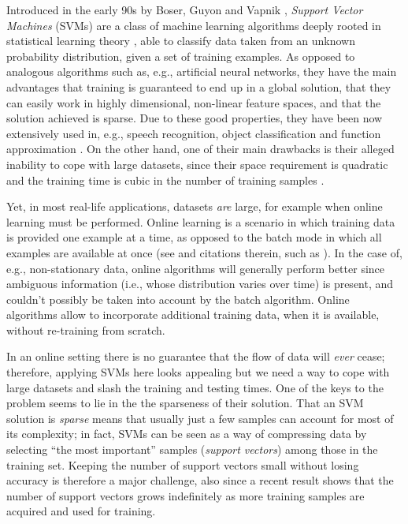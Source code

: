 Introduced in the early 90s by Boser, Guyon and Vapnik \cite{BGV92},
\emph{Support Vector Machines} (SVMs) are a class of machine learning
algorithms deeply rooted in statistical learning theory
\cite{v-edbed-82}, able to classify data taken from an unknown
probability distribution, given a set of training examples. As opposed
to analogous algorithms such as, e.g., artificial neural networks,
they have the main advantages that training is guaranteed to end up in
a global solution, that they can easily work in highly dimensional,
non-linear feature spaces, and that the solution achieved is
sparse. Due to these good properties, they have been now extensively
used in, e.g., speech recognition, object classification and function
approximation \cite{Cristianini00}. On the other hand, one of their
main drawbacks is their alleged inability to cope with large datasets,
since their space requirement is quadratic and the training time is
cubic in the number of training samples \cite{KeerthiCDC06}.

Yet, in most real-life applications, datasets \emph{are} large, for
example when online learning must be performed. Online learning is a
scenario in which training data is provided one example at a time, as
opposed to the batch mode in which all examples are available at once
(see \cite{Laskov2006} and citations therein, such as
\cite{Munro1951,lecun98efficient,Murata2002}). In the case of, e.g.,
non-stationary data, online algorithms will generally perform better
since ambiguous information (i.e., whose distribution varies over
time) is present, and couldn't possibly be taken into account by the
batch algorithm. Online algorithms allow to incorporate additional
training data, when it is available, without re-training from scratch.

In an online setting there is no guarantee that the flow of data will
\emph{ever} cease; therefore, applying SVMs here looks appealing but
we need a way to cope with large datasets and slash the training and
testing times. One of the keys to the problem seems to lie in the the
sparseness of their solution. That an SVM solution is \emph{sparse}
means that usually just a few samples can account for most of its
complexity; in fact, SVMs can be seen as a way of compressing data by
selecting ``the most important'' samples (\emph{support vectors})
among those in the training set. Keeping the number of support vectors
small without losing accuracy is therefore a major challenge, also
since a recent result \cite{Steinwart03} shows that the number of
support vectors grows indefinitely as more training samples are
acquired and used for training.

